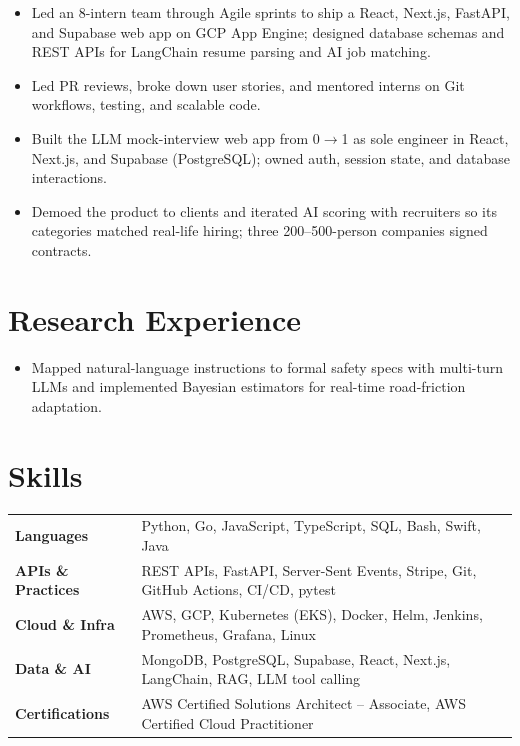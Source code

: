 \documentclass[11pt, letterpaper]{article}
\begin{document}
\vspace{1pt}
\begin{itemize}
  \item Led an 8-intern team through Agile sprints to ship a React, Next.js, FastAPI, and Supabase web app on GCP App Engine; designed database schemas and REST APIs for LangChain resume parsing and AI job matching.
  \item Led PR reviews, broke down user stories, and mentored interns on Git workflows, testing, and scalable code.
\end{itemize}

\vspace{1pt}
\begin{itemize}
  \item Built the LLM mock-interview web app from 0$\to$1 as sole engineer in React, Next.js, and Supabase (PostgreSQL); owned auth, session state, and database interactions.
  \item Demoed the product to clients and iterated AI scoring with recruiters so its categories matched real-life hiring; three 200--500-person companies signed contracts.
\end{itemize}

\section{Research Experience}
\begin{itemize}
  \item Mapped natural-language instructions to formal safety specs with multi-turn LLMs and implemented Bayesian estimators for real-time road-friction adaptation.
\end{itemize}

\section{Skills}
\begin{tabularx}{\textwidth}{@{}l @{\hspace{7pt}} >{\raggedright\arraybackslash}X@{}}
  \textbf{Languages} & Python, Go, JavaScript, TypeScript, SQL, Bash, Swift, Java \\[1pt]
  \textbf{APIs \& Practices} & REST APIs, FastAPI, Server-Sent Events, Stripe, Git, GitHub Actions, CI/CD, pytest \\[1pt]
  \textbf{Cloud \& Infra} & AWS, GCP, Kubernetes (EKS), Docker, Helm, Jenkins, Prometheus, Grafana, Linux \\[1pt]
  \textbf{Data \& AI} & MongoDB, PostgreSQL, Supabase, React, Next.js, LangChain, RAG, LLM tool calling \\[1pt]
  \textbf{Certifications} & AWS Certified Solutions Architect -- Associate, AWS Certified Cloud Practitioner \\
\end{tabularx}
\end{document}
